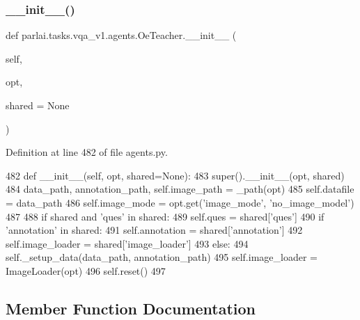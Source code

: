 \subsubsection{\texorpdfstring{\+\_\+\+\_\+init\+\_\+\+\_\+()}{\_\_init\_\_()}}
{\footnotesize\ttfamily def parlai.\+tasks.\+vqa\+\_\+v1.\+agents.\+Oe\+Teacher.\+\_\+\+\_\+init\+\_\+\+\_\+ (\begin{DoxyParamCaption}\item[{}]{self,  }\item[{}]{opt,  }\item[{}]{shared = {\ttfamily None} }\end{DoxyParamCaption})}



Definition at line 482 of file agents.\+py.


\begin{DoxyCode}
482     \textcolor{keyword}{def }\_\_init\_\_(self, opt, shared=None):
483         super().\_\_init\_\_(opt, shared)
484         data\_path, annotation\_path, self.image\_path = \_path(opt)
485         self.datafile = data\_path
486         self.image\_mode = opt.get(\textcolor{stringliteral}{'image\_mode'}, \textcolor{stringliteral}{'no\_image\_model'})
487 
488         \textcolor{keywordflow}{if} shared \textcolor{keywordflow}{and} \textcolor{stringliteral}{'ques'} \textcolor{keywordflow}{in} shared:
489             self.ques = shared[\textcolor{stringliteral}{'ques'}]
490             \textcolor{keywordflow}{if} \textcolor{stringliteral}{'annotation'} \textcolor{keywordflow}{in} shared:
491                 self.annotation = shared[\textcolor{stringliteral}{'annotation'}]
492             self.image\_loader = shared[\textcolor{stringliteral}{'image\_loader'}]
493         \textcolor{keywordflow}{else}:
494             self.\_setup\_data(data\_path, annotation\_path)
495             self.image\_loader = ImageLoader(opt)
496         self.reset()
497 
\end{DoxyCode}


\subsection{Member Function Documentation}
\mbox{\label{classparlai_1_1tasks_1_1vqa__v1_1_1agents_1_1OeTeacher_a932ca5499779ef050d1fdb605c9e7f67}} 
